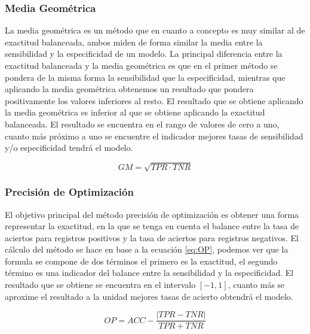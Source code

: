 \subsubsection{Media Geométrica}

La media geométrica \cite{tharwat_2018} es un método que en cuanto a concepto es muy similar al de exactitud balanceada, ambos miden de forma similar la media entre la sensibilidad y la especificidad de un modelo. La principal diferencia entre la exactitud balanceada y la media geométrica es que en el primer método se pondera de la misma forma la sensibilidad que la especificidad, mientras que aplicando la media geométrica obtenemos un resultado que pondera positivamente los valores inferiores al resto. El resultado que se obtiene aplicando la media geométrica es inferior al que se obtiene aplicando la exactitud balanceada. El resultado se encuentra en el rango de valores de cero a uno, cuanto más próximo a uno se encuentre el indicador mejores tasas de sensibilidad y/o especificidad tendrá el modelo.

\bigbreak

\begin{equation}
    GM = \sqrt{TPR \cdot TNR}
    \label{eq:GM}
\end{equation}


\subsubsection{Precisión de Optimización}

El objetivo principal del método precisión de optimización \cite{OP2006} es obtener una forma representar la exactitud, en la que se tenga en cuenta el balance entre la tasa de aciertos para registros positivos y la tasa de aciertos para registros negativos. El cálculo del método se hace en base a la ecuación \ref{eq:OP}, podemos ver que la formula se compone de dos términos el primero es la exactitud, el segundo término es una indicador del balance entre la sensibilidad y la especificidad. El resultado que se obtiene se encuentra en el intervalo $[-1, 1]$, cuanto más se aproxime el resultado a la unidad mejores tasas de acierto obtendrá el modelo.

\bigbreak

\begin{equation}
    OP = ACC - \frac{|TPR-TNR|}{TPR+TNR}
    \label{eq:OP}
\end{equation}

